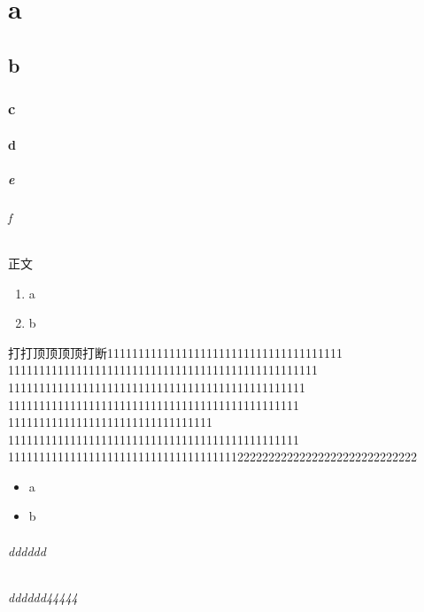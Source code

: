 \documentclass{ctexbook}
\begin{document}
\tableofcontents
\part{a}
\chapter{b}
\section{c}
\subsection{d}
\subsubsection{e}
\paragraph{f}
正文

\begin{enumerate}
\item a
\item b
\end{enumerate}
打打顶顶顶顶打断11111111111111111111111111111111111111
11111111111111111111111111111111111111111111111111
111111111111111111111111111111111111111111111111
11111111111111111111111111111111111111111111111
111111111111111111111111111111111
11111111111111111111111111111111111111111111111
111111111111111111111111111111111111122222222222222222222222222222
\begin{itemize}
\item a
\item b
\end{itemize}
\paragraph{dddddd}
\paragraph*{dddddd44444}
\end{document}
